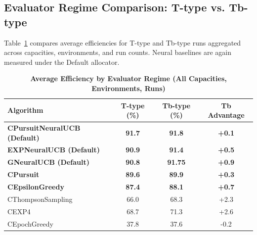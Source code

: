 \documentclass[12pt,a4paper]{article}
\newcommand{\performance}[1]{\textcolor{performancecolor}{\textbf{#1}}}
\newcommand{\legacy}[1]{\textcolor{legacycolor}{\textbf{#1}}}
\newcommand{\neural}[1]{\textcolor{neuralcolor}{\textbf{#1}}}
\begin{document}
\newpage
\subsection{Evaluator Regime Comparison: T-type vs. Tb-type}

Table~\ref{tab:regime-comparison} compares average efficiencies for T-type and Tb-type runs aggregated across capacities, environments, and run counts. Neural baselines are again measured under the Default allocator.

\begin{table}[H]
\centering
\caption{\performance{Average Efficiency by Evaluator Regime (All Capacities, Environments, Runs)}}
\label{tab:regime-comparison}
\begin{tabular}{|l|c|c|c|}
\hline
\textbf{Algorithm} & \textbf{T-type (\%)} & \textbf{Tb-type (\%)} & \textbf{Tb Advantage} \\
\hline
\hline
\neural{CPursuitNeuralUCB (Default)}   & \neural{91.7}     & \neural{91.8}     & \neural{+0.1} \\
\legacy{EXPNeuralUCB (Default)}        & \legacy{90.9}     & \legacy{91.4}     & \legacy{+0.5} \\
\neural{GNeuralUCB (Default)}          & \neural{90.8}     & \neural{91.75}    & \neural{+0.9} \\
\performance{CPursuit}                 & \performance{89.6} & \performance{89.9} & \performance{+0.3} \\
\performance{CEpsilonGreedy}           & \performance{87.4} & \performance{88.1} & \performance{+0.7} \\
CThompsonSampling                      & 66.0              & 68.3              & +2.3 \\
CEXP4                                  & 68.7              & 71.3              & +2.6 \\
CEpochGreedy                           & 37.8              & 37.6              & -0.2 \\
\hline
\end{tabular}
\end{table}
\end{document}
